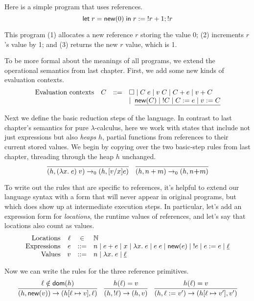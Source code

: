 \documentclass{amsbook}
\theoremstyle{definition}
\theoremstyle{remark}
\numberwithin{section}{chapter}
\numberwithin{equation}{chapter}
\begin{document}
Here is a simple program that uses references.
$$\mathsf{let} \; r = \mathsf{new}(0) \; \mathsf{in} \; r := \; !r + 1; !r$$

This program (1) allocates a new reference $r$ storing the value 0; (2) increments $r$'s value by 1; and (3) returns the new $r$ value, which is 1.

To be more formal about the meanings of all programs, we extend the operational semantics from last chapter.
First, we add some new kinds of evaluation contexts.
$$\begin{array}{rrcl}
  \textrm{Evaluation contexts} & C &::=& \Box \mid C \; e \mid v \; C \mid C + e \mid v + C \\
  &&& \mid \; \underline{\mathsf{new}(C) \mid \; !C \mid C := e \mid v := C}
\end{array}$$

Next we define the basic reduction steps of the language.
In contrast to last chapter's semantics for pure $\lambda$-calculus, here we work with states that include not just expressions but also \emph{heaps} $h$, partial functions from references to their current stored values.
We begin by copying over the two basic-step rules from last chapter, threading through the heap $h$ unchanged.
$$\infer{\smallstepo{(h, (\lambda x. \; e) \; v)}{(h, \subst{e}{x}{v})}}{}
\quad \infer{\smallstepo{(h, n + m)}{(h, n \textbf{+} m)}}{}$$

To write out the rules that are specific to references, it's helpful to extend our language syntax with a form that will never appear in original programs, but which does show up at intermediate execution steps.
In particular, let's add an expression form for \emph{locations}, the runtime values of references, and let's say that locations also count as values.
$$\begin{array}{rrcl}
  \textrm{Locations} & \ell &\in& \mathbb N \\
  \textrm{Expressions} & e &::=& n \mid e + e \mid x \mid \lambda x. \; e \mid e \; e \mid \mathsf{new}(e) \mid \; !e \mid e := e \mid \underline{\ell} \\
  \textrm{Values} & v &::=& n \mid \lambda x. \; e \mid \underline{\ell}
\end{array}$$

\newcommand{\dom}[1]{\mathsf{dom}(#1)}
Now we can write the rules for the three reference primitives.
$$\infer{\smallstep{(h, \newref{v})}{(\mupd{h}{\ell}{v}, \ell)}}{
  \ell \notin \dom{h}
}
\quad \infer{\smallstep{(h, \readref{\ell})}{(h, v)}}{
  \msel{h}{\ell} = v
}
\quad \infer{\smallstep{(h, \writeref{\ell}{v'})}{(\mupd{h}{\ell}{v'}, v')}}{
  \msel{h}{\ell} = v
}$$
\end{document}
